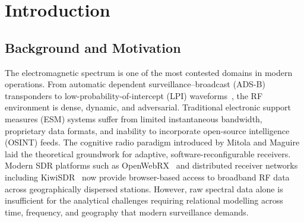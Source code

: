 \documentclass[sensors,article,submit,pdftex]{mdpi}
\begin{document}

\section{Introduction}
\label{sec:introduction}

\subsection{Background and Motivation}
The electromagnetic spectrum is one of the most contested domains in modern operations. From automatic dependent surveillance--broadcast (ADS-B) transponders to low-probability-of-intercept (LPI) waveforms~\cite{enns2012}, the RF environment is dense, dynamic, and adversarial. Traditional electronic support measures (ESM) systems suffer from limited instantaneous bandwidth, proprietary data formats, and inability to incorporate open-source intelligence (OSINT) feeds. The cognitive radio paradigm introduced by Mitola and Maguire~\cite{mitola1999} laid the theoretical groundwork for adaptive, software-reconfigurable receivers. Modern SDR platforms such as OpenWebRX~\cite{openwebrx} and distributed receiver networks including KiwiSDR~\cite{kiwisdr} now provide browser-based access to broadband RF data across geographically dispersed stations. However, raw spectral data alone is insufficient for the analytical challenges requiring relational modelling across time, frequency, and geography that modern surveillance demands.
\end{document}
